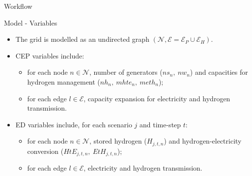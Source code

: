 \begin{frame}{Workflow}
\begin{center}
{\begin{tikzpicture}[node distance=2cm, auto, >=stealth]
    \end{tikzpicture}
    }
  \end{center}


\end{frame}
  
  \begin{frame}{Model - Variables}
   
      \begin{minipage}{0.6\textwidth}
        \begin{itemize}
          \item The grid is modelled as an undirected graph $(\mathcal{N},\mathcal{E}=\mathcal{E}_P\cup\mathcal{E}_H)$.
        \end{itemize}
      \end{minipage}
    \begin{itemize}
      \item CEP variables include: 
      \begin{itemize}
      \item for each node $n\in\mathcal{N}$, number of generators ($ns_n,\ nw_n$) and capacities for hydrogen management ($nh_n,\ mhte_n,\ meth_n$); 
      \item for each edge $l\in\mathcal{E}$, capacity expansion for electricity and hydrogen transmission.
    \end{itemize}
    \vspace{1em}
    \item ED variables include, for each scenario $j$ and time-step $t$:
    \begin{itemize}
    \item for each node $n\in\mathcal{N}$, stored hydrogen ($H_{j,t,n}$) and hydrogen-electricity conversion ($HtE_{j,t,n},\ EtH_{j,t,n}$);
    \item for each edge $l\in\mathcal{E}$, electricity and hydrogen transmission.
    \end{itemize}
      \end{itemize}
  \end{frame}

